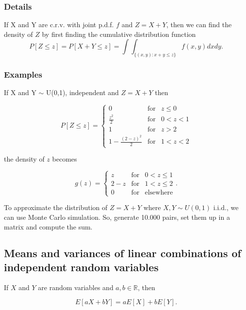 \documentclass[12pt,a4paper]{article}
\theoremstyle{regla}
\theoremstyle{remark}
\theoremstyle{definition}
\theoremstyle{nonumberbreak}
\begin{document}
\subsubsection{Details}
If X and Y are c.r.v. with joint p.d.f. $f$ and $Z=X+Y$, then we can find the density of $Z$ by first finding the cumulative distribution function $$P[Z \leq z]=P[X+Y \leq z]=\int\int_{\{(x,y):x+y \leq z\}} f(x,y)dxdy.$$
\subsubsection{Examples}
\begin{xmpl}

If X and Y $\sim$ U(0,1), independent and $Z=X+Y$ then 
 
$$
P[Z \leq z]= 
\begin{cases}
  0 & \text{for} & z \leq 0\\
  \frac{z^2}{2} & \text{for} & 0< z <1\\
  1 & \text{for}& z>2\\
  1-\frac{(2-z)^2}{2} & \text{for} & 1< z <2
\end{cases}
$$

the density of $z$ becomes 

$$
g(z)= 
\begin{cases}
  z & \text{for} & 0 < z \leq 1\\
  2-z & \text{for} & 1 < z \leq 2\\
  0 & \text{for} & \text{elsewhere}
\end{cases}.
$$
\end{xmpl}

\begin{xmpl}

To approximate the distribution of $Z=X+Y$ where $X,Y \sim U(0,1)$ i.i.d., we can use Monte Carlo simulation. So, generate 10.000 pairs, set them up in a matrix and compute the sum. 
\end{xmpl}

\subsection{Means and variances of linear combinations of independent random variables}
\begin{fbox}
\begin{minipage}{0.97\textwidth}
If $X$ and $Y$ are random variables and $a,b\in\mathbb{R}$, then

$$
E[aX+bY] = aE[X]+bE[Y].
$$
\end{minipage}
\end{fbox}
\end{document}
